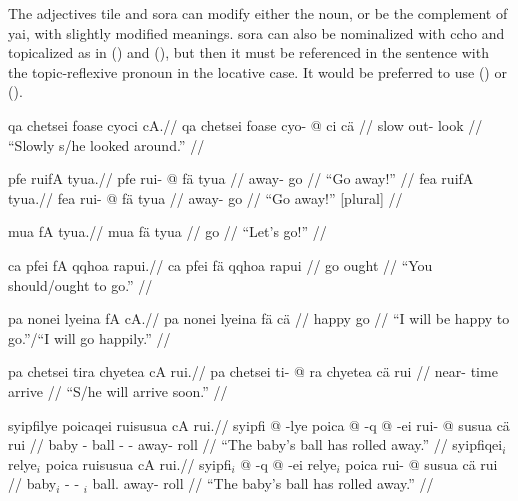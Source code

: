 \documentclass{article}
\begin{document}
The adjectives {\quch tile} and {\quch sora} can modify either the noun, or be the complement of {\quch yai}, with slightly modified meanings.  {\quch sora} can also be nominalized with {\quch ccho} and topicalized as in () and (), but then it must be referenced in the sentence with the topic-reflexive pronoun in the locative case. It would be preferred to use () or ().

\ex[lingstyle=QuCheanya] \begingl
\glpreamble qa chetsei foase cyoci cA.//
\gla qa chetsei foase cyo- @ ci c\"a //
\glb {}  slow out- look  //
\glft ``Slowly s/he looked around.'' //
\endgl \xe

\pex[lingstyle=QuCheanya] 
\a \begingl
\glpreamble pfe ruifA tyua.//
\gla pfe rui- @ f\"a tyua //
\glb {} away- go  //
\glft ``Go away!'' //
\endgl 
\a \begingl
\glpreamble fea ruifA tyua.//
\gla fea rui- @ f\"a tyua //
\glb {} away- go  //
\glft ``Go away!'' [plural] //
\endgl
\xe

\ex[lingstyle=QuCheanya] \begingl
\glpreamble mua fA tyua.//
\gla mua f\"a tyua //
\glb {} go  //
\glft ``Let's go!'' //
\endgl \xe

\ex[lingstyle=QuCheanya] \begingl
\glpreamble ca pfei fA qqhoa rapui.//
\gla ca pfei f\"a qqhoa rapui //
\glb {}  go  ought //
\glft ``You should/ought to go.'' //
\endgl \xe

\ex[lingstyle=QuCheanya] \begingl
\glpreamble pa nonei lyeina fA cA.//
\gla pa nonei lyeina f\"a c\"a //
\glb {}  happy go  //
\glft ``I will be happy to go.''/``I will go happily.'' //
\endgl \xe

\ex[lingstyle=QuCheanya] \begingl
\glpreamble pa chetsei tira chyetea cA rui.//
\gla pa chetsei ti- @ ra chyetea c\"a rui //
\glb {}  near- time arrive   //
\glft ``S/he will arrive soon.'' //
\endgl \xe

\pex[lingstyle=QuCheanya] 
\a \begingl
\glpreamble syipfilye poicaqei ruisusua cA rui.//
\gla syipfi @ -lye poica @ -q @ -ei rui- @ susua c\"a rui //
\glb baby - ball - - away- roll   //
\glft ``The baby's ball has rolled away.'' //
\endgl
\a \begingl
\glpreamble syipfiqei$_i$ relye$_i$ poica ruisusua cA rui.//
\gla syipfi$_i$ @ -q @ -ei relye$_i$ poica rui- @ susua c\"a rui //
\glb baby$_i$ - - $_i$ ball. away- roll   //
\glft ``The baby's ball has rolled away.'' //
\endgl
\xe
\end{document}

